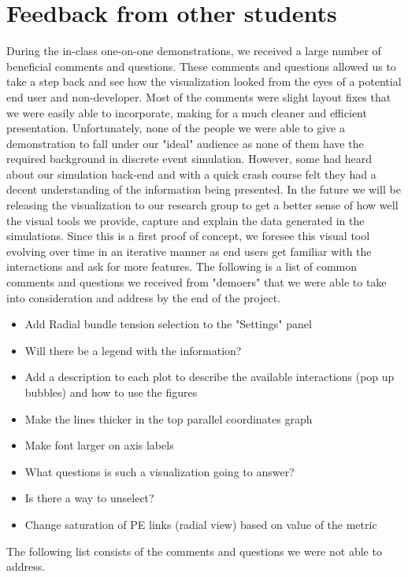 \documentclass{acm_proc_article-sp}
\begin{document}
\section{Feedback from other students}
During the in-class one-on-one demonstrations, we received a large number of beneficial comments and questions. These comments and questions allowed us to take a step back and see how the visualization looked from the eyes of a potential end user and non-developer. Most of the comments were slight layout fixes that we were easily able to incorporate, making for a much cleaner and efficient presentation. Unfortunately, none of the people we were able to give a demonstration to fall under our "ideal" audience as none of them have the required background in discrete event simulation. However, some had heard about our simulation back-end and with a quick crash course felt they had a decent understanding of the information being presented. In the future we will be releasing the visualization to our research group to get a better sense of how well the visual tools we provide, capture and explain the data generated in the simulations. Since this is a first proof of concept, we foresee this visual tool evolving over time in an iterative manner as end users get familiar with the interactions and ask for more features. The following is a list of common comments and questions we received from "demoers" that we were able to take into consideration and address by the end of the project. 

\begin{itemize}
\item Add Radial bundle tension selection to the "Settings" panel
\item Will there be a legend with the information?
\item Add a description to each plot to describe the available interactions (pop up bubbles) and how to use the figures
\item Make the lines thicker in the top parallel coordinates graph
\item Make font larger on axis labels
\item What questions is such a visualization going to answer?
\item Is there a way to unselect?
\item Change saturation of PE links (radial view) based on value of the metric
\end{itemize}

The following list consists of the comments and questions we were not able to address.
\end{document}
